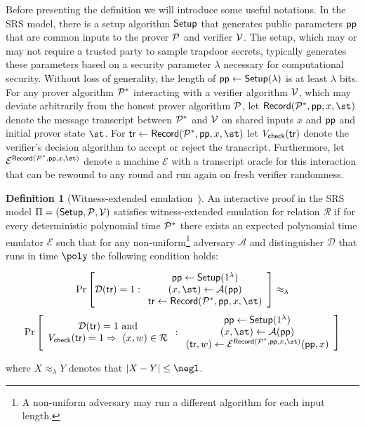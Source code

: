 \documentclass{article}
\theoremstyle{definition}
\newtheorem{definition}{Definition}
\begin{document}
Before presenting the definition we will introduce some useful notations. In the SRS model, there is a setup algorithm $\textsf{{Setup}}$ that generates public parameters $\textsf{pp}$ that are common inputs to the prover $\mathcal{P}$ and verifier $\mathcal{V}$. The setup, which may or may not require a trusted party to sample trapdoor secrets, typically generates these parameters based on a security parameter $\lambda$ necessary for computational security. Without loss of generality, the length of $\textsf{pp} \gets \textsf{{Setup}}(\lambda)$ is at least $\lambda$ bits. For any prover algorithm $\mathcal{P}^*$ interacting with a verifier algorithm $\mathcal{V}$, which may deviate arbitrarily from the honest prover algorithm $\mathcal{P}$, let $\textsf{Record}(\prover^*, \params, x, \st)$ denote the message transcript between $\mathcal{P}^*$ and $\mathcal{V}$ on shared inputs $x$ and $\textsf{pp}$ and initial prover state $\st$. For $\tr \gets \textsf{Record}(\prover^*, \params, x, \st)$ let $V_{\textsf{check}}(\textsf{{tr}})$ denote the verifier's decision algorithm to accept or reject the transcript. Furthermore, let $\mathcal{E}^{\textsf{Record}(\prover^*, \params, x, \st)}$ denote a machine $\mathcal{E}$ with a transcript oracle for this interaction that can be rewound to any round and run again on fresh verifier randomness.

\begin{definition}[Witness-extended emulation~\cite{EC:GroIsh08,C:Lindell01}]\label{def:wee} 
An interactive proof in the SRS model $\Pi = (\textsf{Setup}, \mathcal{P}, \mathcal{V})$ satisfies witness-extended emulation for relation $\mathcal{R}$ if for every deterministic polynomial time $\mathcal{P}^*$ there exists an expected polynomial time emulator $\mathcal{E}$ such that for any non-uniform\footnote{A non-uniform adversary may run a different algorithm for each input length.} adversary $\mathcal{A}$ and distinguisher $\mathcal{D}$ that runs in time $\poly$ the following condition holds: 
\begin{small}
\[
\Pr \left[
\mathcal{D}(\textsf{tr}) = 1
:
\begin{array}{c}
             \params \leftarrow \textsf{Setup}(1^\lambda) \\
             (x, \st) \leftarrow \mathcal{A}(\params) \\
             \tr \leftarrow \textsf{Record}(\prover^*, \params, x, \st)
\end{array} 
\right] \approx_\lambda
\]
\[
\Pr \left[
\begin{array}{c} 
\mathcal{D}(\textsf{tr}) = 1 \ \text{and} \\ 
V_{\textsf{check}}(\tr) = 1 \Rightarrow \ (x, w) \in \mathcal{R}
\end{array} 
:
\begin{array}{c}
             \params \leftarrow \textsf{Setup}(1^\lambda) \\
             (x, \st) \leftarrow \mathcal{A}(\params) \\
(\textsf{tr}, w) \leftarrow \mathcal{E}^{\textsf{Record}(\prover^*, \params, x, \st)}(\params, x)
\end{array}
\right]
\]
\end{small}
where $X \approx_\lambda Y$ denotes that $|X - Y| \leq \negl$. 
\end{definition}
\end{document}
